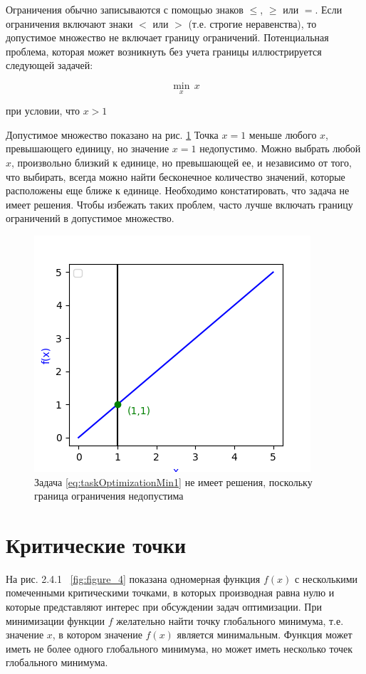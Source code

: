 Ограничения обычно записываются с помощью знаков $\leq$, $\geq$ или $=$. Если ограничения включают знаки $<$ или $>$ (т.е. строгие неравенства), то допустимое множество не включает границу ограничений. Потенциальная проблема, которая может возникнуть без учета границы иллюстрируется следующей задачей:


\begin{equation}
  \min_{x} \, x 
  \label{eq:taskOptimizationMin1}
\end{equation}

 \begin{center}
 при условии, что $x>1$
 \end{center}

 Допустимое множество показано на рис. \ref{fig:figure_3} Точка $x = 1$ меньше любого $x$, превышающего единицу, но значение $x = 1$ недопустимо. Можно выбрать любой $x$, произвольно близкий к единице, но превышающей ее, и независимо от того, что выбирать, всегда можно найти бесконечное количество значений, которые расположены еще ближе к единице. Необходимо констатировать, что задача не имеет решения. Чтобы избежать таких проблем, часто лучше включать границу ограничений в допустимое множество.


\begin{figure}[ht]
 \centering
		\includegraphics[height = 5 cm, keepaspectratio]{../assets/images/Figure_3.png}
		\caption{ Задача \eqref{eq:taskOptimizationMin1} не имеет решения, поскольку граница ограничения недопустима }
		\label{fig:figure_3}
	\end{figure}
    
\section{Критические точки}

На рис. 2.4.1 ~\ref{fig:figure_4} показана одномерная функция $f(x)$ с несколькими помеченными критическими точками, в которых производная равна нулю и которые представляют интерес при обсуждении задач оптимизации. При минимизации функции $f$ желательно найти точку глобального минимума, т.е. значение $x$, в котором значение $f(x)$ является минимальным. Функция может иметь не более одного глобального минимума, но может иметь несколько точек глобального минимума.

